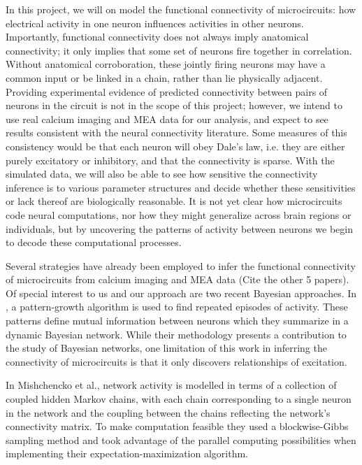 \documentclass{article}
\begin{document}
In this project, we will on model the functional connectivity of
microcircuits: how electrical activity in one neuron influences
activities in other neurons. Importantly, functional connectivity
does not always imply anatomical connectivity; it only implies that
some set of neurons fire together in correlation.  Without anatomical
corroboration, these jointly firing neurons may have a common input
or be linked in a chain, rather than lie physically adjacent.
Providing experimental evidence of predicted connectivity between
pairs of neurons in the circuit is not in the scope of this project;
however, we intend to use real calcium imaging and MEA data for our
analysis, and expect to see results consistent with the neural
connectivity literature.  Some measures of this consistency would
be that each neuron will obey Dale’s law, i.e. they are either
purely excitatory or inhibitory, and that the connectivity is sparse.
With the simulated data, we will also be able to see how sensitive
the connectivity inference is to various parameter structures and
decide whether these sensitivities or lack thereof are biologically
reasonable. It is not yet clear how microcircuits code neural
computations, nor how they might generalize across brain regions
or individuals, but by uncovering the patterns of activity between
neurons we begin to decode these computational processes.


Several strategies have already been employed to infer the functional
connectivity of microcircuits from calcium imaging and MEA data
(Cite the other 5 papers). Of special interest to us and our approach
are two recent Bayesian approaches. In \citep{patnaik2011}, 
a pattern-growth algorithm is used to find repeated episodes of
activity. These patterns define mutual information between neurons
which they summarize in a dynamic Bayesian network. While their
methodology presents a contribution to the study of Bayesian networks,
one limitation of this work in inferring the connectivity of
microcircuits is that it only discovers relationships of excitation.

In Mishchencko et al., network activity is modelled in terms of a
collection of coupled hidden Markov chains, with each chain
corresponding to a single neuron in the network and the coupling
between the chains reflecting the network’s connectivity matrix.
To make computation feasible they used a blockwise-Gibbs sampling
method and took advantage of the parallel computing possibilities
when implementing their expectation-maximization algorithm.
\end{document}
